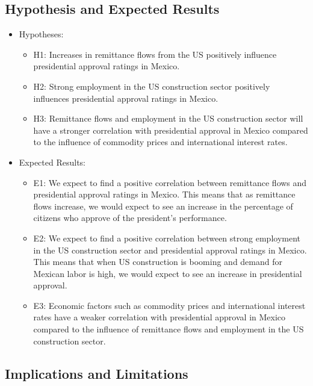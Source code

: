 \documentclass[
]{article}
\providecommand{\tightlist}{%
  \setlength{\itemsep}{0pt}\setlength{\parskip}{0pt}}
\begin{document}
\hypertarget{hypothesis-and-expected-results}{%
\subsection{Hypothesis and Expected
Results}\label{hypothesis-and-expected-results}}

\begin{itemize}
\tightlist
\item
  Hypotheses:

  \begin{itemize}
  \tightlist
  \item
    H1: Increases in remittance flows from the US positively influence
    presidential approval ratings in Mexico.
  \item
    H2: Strong employment in the US construction sector positively
    influences presidential approval ratings in Mexico.
  \item
    H3: Remittance flows and employment in the US construction sector
    will have a stronger correlation with presidential approval in
    Mexico compared to the influence of commodity prices and
    international interest rates.
  \end{itemize}
\item
  Expected Results:

  \begin{itemize}
  \tightlist
  \item
    E1: We expect to find a positive correlation between remittance
    flows and presidential approval ratings in Mexico. This means that
    as remittance flows increase, we would expect to see an increase in
    the percentage of citizens who approve of the president's
    performance.
  \item
    E2: We expect to find a positive correlation between strong
    employment in the US construction sector and presidential approval
    ratings in Mexico. This means that when US construction is booming
    and demand for Mexican labor is high, we would expect to see an
    increase in presidential approval.
  \item
    E3: Economic factors such as commodity prices and international
    interest rates have a weaker correlation with presidential approval
    in Mexico compared to the influence of remittance flows and
    employment in the US construction sector.
  \end{itemize}
\end{itemize}

\hypertarget{implications-and-limitations}{%
\subsection{Implications and
Limitations}\label{implications-and-limitations}}
\end{document}
